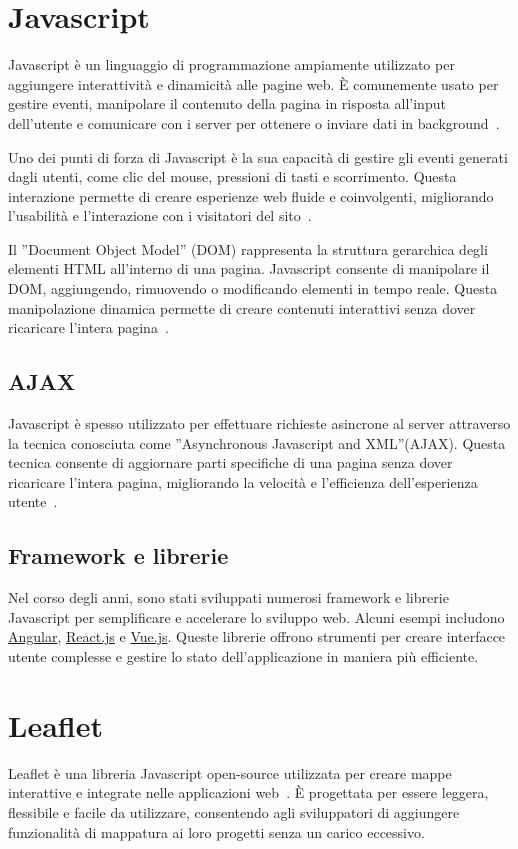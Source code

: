 \section{Javascript}
Javascript è un linguaggio di programmazione ampiamente utilizzato per aggiungere interattività e dinamicità alle pagine web. È comunemente usato per gestire eventi, manipolare il contenuto della pagina in risposta all'input dell'utente e comunicare con i server per ottenere o inviare dati in background~\cite{Javascript, ALL_WEB}.

Uno dei punti di forza di Javascript è la sua capacità di gestire gli eventi generati dagli utenti, come clic del mouse, pressioni di tasti e scorrimento. Questa interazione permette di creare esperienze web fluide e coinvolgenti, migliorando l'usabilità e l'interazione con i visitatori del sito~\cite{Javascript}.

Il ”Document Object Model” (DOM) rappresenta la struttura gerarchica degli elementi HTML all'interno di una pagina. Javascript consente di manipolare il DOM, aggiungendo, rimuovendo o modificando elementi in tempo reale. Questa manipolazione dinamica permette di creare contenuti interattivi senza dover ricaricare l'intera pagina~\cite{ALL_WEB, Javascript}.

\subsection{AJAX}
Javascript è spesso utilizzato per effettuare richieste asincrone al server attraverso la tecnica conosciuta come ”Asynchronous Javascript and XML”(AJAX). Questa tecnica consente di aggiornare parti specifiche di una pagina senza dover ricaricare l'intera pagina, migliorando la velocità e l'efficienza dell'esperienza utente~\cite{ALL_WEB}.

\subsection{Framework e librerie}
Nel corso degli anni, sono stati sviluppati numerosi framework e librerie Javascript per semplificare e accelerare lo sviluppo web. Alcuni esempi includono \href{https://angular.io/}{Angular}, \href{https://react.dev/}{React.js} e \href{https://vuejs.org/}{Vue.js}. Queste librerie offrono strumenti per creare interfacce utente complesse e gestire lo stato dell'applicazione in maniera più efficiente.

\section{Leaflet}
Leaflet è una libreria Javascript open-source utilizzata per creare mappe interattive e integrate nelle applicazioni web~\cite{Leaflet}. È progettata per essere leggera, flessibile e facile da utilizzare, consentendo agli sviluppatori di aggiungere funzionalità di mappatura ai loro progetti senza un carico eccessivo.

